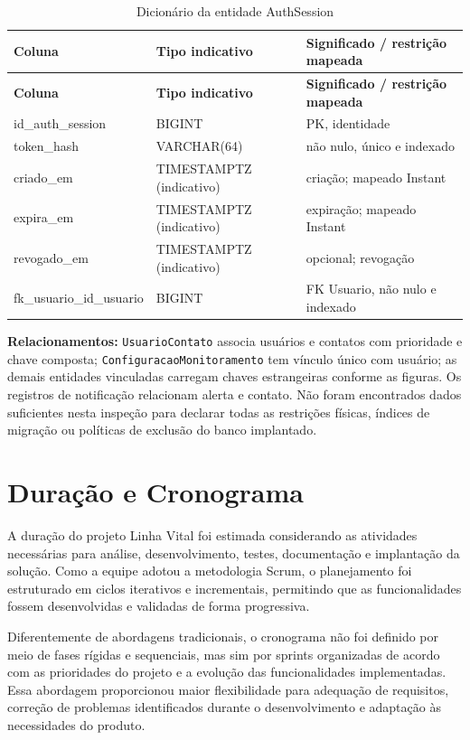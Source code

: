 \begin{longtable}{p{4.8cm}p{3.05cm}p{5.05cm}}
\caption{Dicionário da entidade AuthSession}\label{quad_authsession}\\
\hline
\textbf{Coluna} & \textbf{Tipo indicativo} & \textbf{Significado / restrição mapeada} \\
\hline
\endfirsthead
\hline\textbf{Coluna} & \textbf{Tipo indicativo} & \textbf{Significado / restrição mapeada} \\
\hline
\endhead
id\_auth\_session & BIGINT & PK, identidade \\
\hline
token\_hash & VARCHAR(64) & não nulo, único e indexado \\
\hline
criado\_em & TIMESTAMPTZ (indicativo) & criação; mapeado Instant \\
\hline
expira\_em & TIMESTAMPTZ (indicativo) & expiração; mapeado Instant \\
\hline
revogado\_em & TIMESTAMPTZ (indicativo) & opcional; revogação \\
\hline
fk\_usuario\_id\_usuario & BIGINT & FK Usuario, não nulo e indexado \\
\hline
\end{longtable}

\noindent\textbf{Relacionamentos:} \texttt{UsuarioContato} associa usuários e contatos com prioridade e chave composta; \texttt{ConfiguracaoMonitoramento} tem vínculo único com usuário; as demais entidades vinculadas carregam chaves estrangeiras conforme as figuras. Os registros de notificação relacionam alerta e contato. Não foram encontrados dados suficientes nesta inspeção para declarar todas as restrições físicas, índices de migração ou políticas de exclusão do banco implantado.

\section{Duração e Cronograma}

A duração do projeto Linha Vital foi estimada considerando as atividades necessárias para análise, desenvolvimento, testes, documentação e implantação da solução. Como a equipe adotou a metodologia Scrum, o planejamento foi estruturado em ciclos iterativos e incrementais, permitindo que as funcionalidades fossem desenvolvidas e validadas de forma progressiva.

Diferentemente de abordagens tradicionais, o cronograma não foi definido por meio de fases rígidas e sequenciais, mas sim por sprints organizadas de acordo com as prioridades do projeto e a evolução das funcionalidades implementadas. Essa abordagem proporcionou maior flexibilidade para adequação de requisitos, correção de problemas identificados durante o desenvolvimento e adaptação às necessidades do produto.

